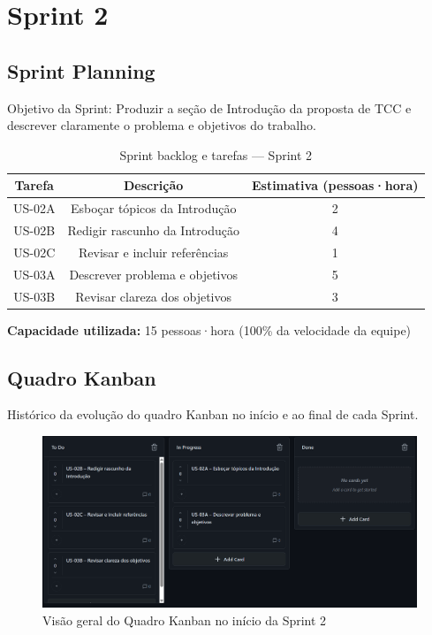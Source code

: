 \section{Sprint 2}

\subsection{Sprint Planning}

Objetivo da Sprint: Produzir a seção de Introdução da proposta de TCC e descrever claramente o problema e objetivos do trabalho.

\begin{table}[htbp]
  \centering
  \caption{Sprint backlog e tarefas — Sprint 2}
  \label{tab:sprint2}
  \begin{tabular}{ccc}
    \toprule
    Tarefa & Descrição & Estimativa (pessoas·hora) \\
    \midrule
    US-02A & Esboçar tópicos da Introdução & 2 \\
    US-02B & Redigir rascunho da Introdução & 4 \\
    US-02C & Revisar e incluir referências & 1 \\
    US-03A & Descrever problema e objetivos & 5 \\
    US-03B & Revisar clareza dos objetivos & 3 \\
    \bottomrule
  \end{tabular}
\end{table}

\vspace{0.5em}
\noindent\textbf{Capacidade utilizada:} 15 pessoas·hora (100\% da velocidade da equipe)

\subsection{Quadro Kanban}

Histórico da evolução do quadro Kanban no início e ao final de cada Sprint.

\begin{figure}[htbp]
  \centering
  \includegraphics[width=0.8\linewidth]{pictures/kanban_sprint2_inicio.png}
  \caption{Visão geral do Quadro Kanban no início da Sprint 2}
\end{figure}

